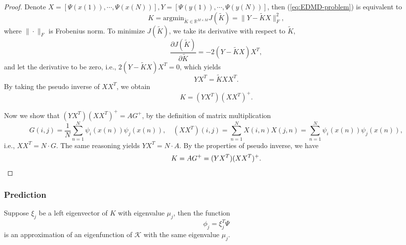 \documentclass[en, bibend=bibtex]{elegantpaper}
\theoremstyle{plain}
\begin{document}
\begin{proof}
  Denote $X = [\Psi(x(1)),\cdots,\Psi(x(N))], Y =
  [\Psi(y(1)),\cdots,\Psi(y(N))]$,
  then (\ref{eq:EDMD-problem}) is equivalent to
  \begin{equation*}
    K = \text{argmin}_{\tilde{K} \in \mathbb{R}^{M \times M}} J(\tilde{K})
    = \|Y - \tilde{K}X\|_F^2,
  \end{equation*}
  where $\|\cdot\|_F$ is Frobenius norm.
  To minimize $J(\tilde{K})$, we take its derivative with respect to $\tilde{K}$,
  \begin{equation*}
    \frac{\partial J(\tilde{K})}{\partial \tilde{K}}
    = - 2(Y - \tilde{K}X)X^T,
  \end{equation*}
  and let the derivative to be zero, i.e.,
  $2(Y-\tilde{K}X)X^T = 0$,
  which yields
  \begin{equation*}
    YX^T = \tilde{K}XX^T.
  \end{equation*}
  By taking the pseudo inverse of $XX^T$,
  we obtain
  \begin{equation*}
    K = (YX^T)(XX^T)^+.
  \end{equation*}

  Now we show that $(YX^T)(XX^T)^+ = AG^+$,
  by the definition of matrix multiplication
  \begin{equation*}
    G(i,j) = \frac{1}{N} \sum\limits_{n = 1}^N \psi_i(x(n))\psi_j(x(n)), \quad
    (XX^T)(i,j) = \sum\limits_{n = 1}^N X(i,n)X(j,n) = \sum\limits_{n = 1}^N \psi_i(x(n))\psi_j(x(n)),
  \end{equation*}
  i.e., $XX^T = N \cdot G$.
  The same reasoning yields $YX^T = N \cdot A$.
  By the properties of pseudo inverse,
  we have
  \begin{equation*}
    K = AG^+ = (YX^T)(XX^T)^+. \qedhere
  \end{equation*}
\end{proof}

\subsubsection{Prediction}

\begin{proposition}
  Suppose $\xi_j$ be a left eigenvector of $K$ with eigenvalue $\mu_j$,
  then the function
  \begin{equation*}
    \phi_j = \xi_j^T \Psi
  \end{equation*}
  is an approximation of an eigenfunction of $\mathcal{K}$
  with the same eigenvalue $\mu_j$.
\end{proposition}
\end{document}
